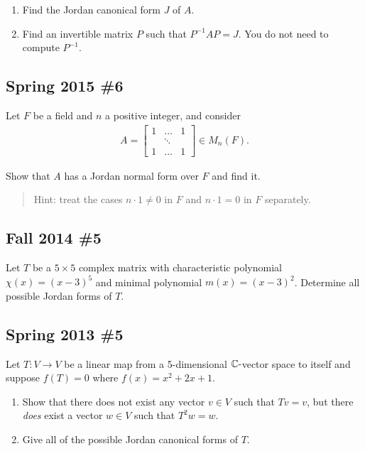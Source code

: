 \begin{enumerate}
\def\labelenumi{\alph{enumi}.}
\item
  Find the Jordan canonical form \(J\) of \(A\).
\item
  Find an invertible matrix \(P\) such that \(P^{-1}A P = J\). You do
  not need to compute \(P^{-1}\).
\end{enumerate}

\hypertarget{spring-2015-6}{%
\subsection{Spring 2015 \#6}\label{spring-2015-6}}

Let \(F\) be a field and \(n\) a positive integer, and consider
\begin{align*}
A=\left[\begin{array}{ccc}
1 & \dots & 1 \\
& \ddots & \\
1 & \dots & 1
\end{array}\right] \in M_{n}(F)
.\end{align*}

Show that \(A\) has a Jordan normal form over \(F\) and find it.

\begin{quote}
Hint: treat the cases \(n\cdot 1 \neq 0\) in \(F\) and \(n\cdot 1 = 0\)
in \(F\) separately.
\end{quote}

\hypertarget{fall-2014-5}{%
\subsection{Fall 2014 \#5}\label{fall-2014-5}}

Let \(T\) be a \(5\times 5\) complex matrix with characteristic
polynomial \(\chi(x) = (x-3)^5\) and minimal polynomial
\(m(x) = (x-3)^2\). Determine all possible Jordan forms of \(T\).

\hypertarget{spring-2013-5}{%
\subsection{Spring 2013 \#5}\label{spring-2013-5}}

Let \(T: V\to V\) be a linear map from a 5-dimensional
\({\mathbb{C}}{\hbox{-}}\)vector space to itself and suppose
\(f(T) = 0\) where \(f(x) = x^2 + 2x + 1\).

\begin{enumerate}
\def\labelenumi{\alph{enumi}.}
\item
  Show that there does not exist any vector \(v\in V\) such that
  \(Tv = v\), but there \emph{does} exist a vector \(w\in V\) such that
  \(T^2 w= w\).
\item
  Give all of the possible Jordan canonical forms of \(T\).
\end{enumerate}

